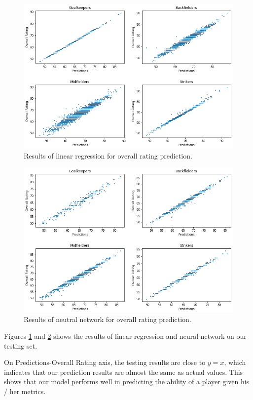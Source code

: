 \documentclass{article}
\begin{document}
\begin{figure}[!htb]
	\centering
    \includegraphics[scale=0.45]{linear.png}
    \caption{Results of linear regression for overall rating prediction.}\label{fig3}
\end{figure}

\begin{figure}[!htb]
	\centering
    \includegraphics[scale=0.45]{nn.png}
    \caption{Results of neutral network for overall rating prediction.}\label{fig4}
\end{figure}

Figures \ref{fig3} and \ref{fig4} shows the results of linear regression and neural network on our testing set.

On Predictions-Overall Rating axis, the testing results are close to $y=x$, which indicates that our prediction results are almost the same as actual values. This shows that our model performs well in predicting the ability of a player given his / her metrics.
\end{document}
